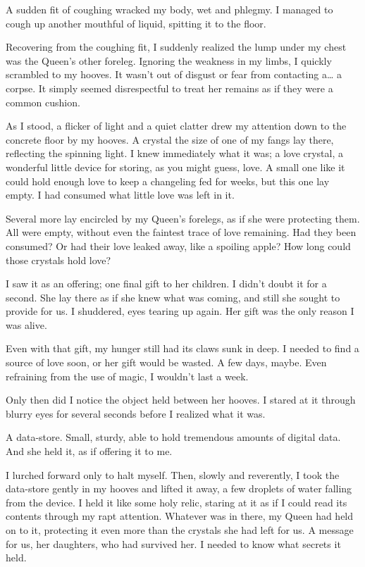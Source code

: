 A sudden fit of coughing wracked my body, wet and phlegmy. I managed to cough up another mouthful of liquid, spitting it to the floor.

Recovering from the coughing fit, I suddenly realized the lump under my chest was the Queen’s other foreleg. Ignoring the weakness in my limbs, I quickly scrambled to my hooves. It wasn’t out of disgust or fear from contacting a… a corpse. It simply seemed disrespectful to treat her remains as if they were a common cushion.

As I stood, a flicker of light and a quiet clatter drew my attention down to the concrete floor by my hooves. A crystal the size of one of my fangs lay there, reflecting the spinning light. I knew immediately what it was; a love crystal, a wonderful little device for storing, as you might guess, love. A small one like it could hold enough love to keep a changeling fed for weeks, but this one lay empty. I had consumed what little love was left in it.

Several more lay encircled by my Queen’s forelegs, as if she were protecting them. All were empty, without even the faintest trace of love remaining. Had they been consumed? Or had their love leaked away, like a spoiling apple? How long could those crystals hold love?

I saw it as an offering; one final gift to her children. I didn’t doubt it for a second. She lay there as if she knew what was coming, and still she sought to provide for us. I shuddered, eyes tearing up again. Her gift was the only reason I was alive.

Even with that gift, my hunger still had its claws sunk in deep. I needed to find a source of love soon, or her gift would be wasted. A few days, maybe. Even refraining from the use of magic, I wouldn’t last a week.

Only then did I notice the object held between her hooves. I stared at it through blurry eyes for several seconds before I realized what it was.

A data-store. Small, sturdy, able to hold tremendous amounts of digital data. And she held it, as if offering it to me.

I lurched forward only to halt myself. Then, slowly and reverently, I took the data-store gently in my hooves and lifted it away, a few droplets of water falling from the device. I held it like some holy relic, staring at it as if I could read its contents through my rapt attention. Whatever was in there, my Queen had held on to it, protecting it even more than the crystals she had left for us. A message for us, her daughters, who had survived her. I needed to know what secrets it held.


